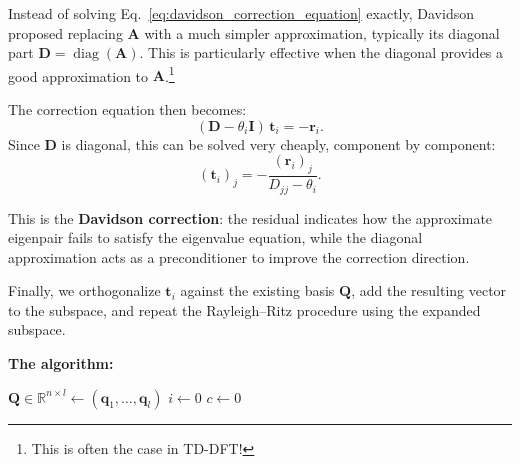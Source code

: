 \documentclass[10pt,aspectratio=169]{beamer}
\begin{document}
\begin{frame}
	Instead of solving Eq.~\eqref{eq:davidson_correction_equation} exactly, Davidson proposed replacing $\mathbf A$ with a much simpler approximation, typically its diagonal part $\mathbf D=\operatorname{diag}(\mathbf A)$. This is particularly effective when the diagonal provides a good approximation to $\mathbf A$.\footnote{This is often the case in TD-DFT!}
	
	\pause
	\medskip
	The correction equation then becomes:
	\begin{equation*}
		(\mathbf D-\theta_i\mathbf I)\,\mathbf t_i=-\mathbf r_i.
	\end{equation*}
	Since $\mathbf D$ is diagonal, this can be solved very cheaply, component by component:
	\begin{equation*}
		\boxed{(\mathbf t_i)_j=-\frac{(\mathbf r_i)_j}{D_{jj}-\theta_i}.}
	\end{equation*}
	
	\medskip
	This is the \textbf{Davidson correction}: the residual indicates how the approximate eigenpair fails to satisfy the eigenvalue equation, while the diagonal approximation acts as a preconditioner to improve the correction direction.
	
	\medskip
	Finally, we orthogonalize $\mathbf t_i$ against the existing basis $\mathbf Q$, add the resulting vector to the subspace, and repeat the Rayleigh--Ritz procedure using the expanded subspace.
\end{frame}

\begin{frame}
	\textbf{The algorithm:}
	\begin{algorithm}[H]
		\SetAlgoLined
		$\mathbf Q\in\mathbb R^{n\times l}\gets(\mathbf q_1,\ldots,\mathbf q_l)$
		$i\gets 0$\;
		$c\gets 0$
	\end{algorithm}
\end{frame}
\end{document}
